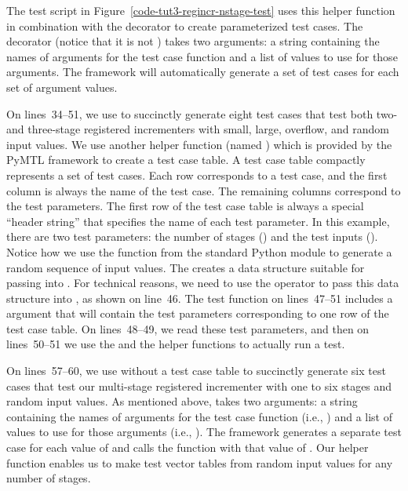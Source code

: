 \documentclass{cbxdoc}
\begin{document}
The test script in Figure~\ref{code-tut3-regincr-nstage-test} uses this
helper function in combination with the 
decorator to create parameterized test cases. The
 decorator (notice that it is
 not ) takes two arguments: a string
containing the names of arguments for the test case function and a list
of values to use for those arguments. The  framework will
automatically generate a set of test cases for each set of argument
values.

On lines~34--51, we use  to succinctly
generate eight test cases that test both two- and three-stage registered
incrementers with small, large, overflow, and random input values. We use
another helper function (named ) which is
provided by the PyMTL framework to create a test case table. A test case
table compactly represents a set of test cases. Each row corresponds to a
test case, and the first column is always the name of the test case. The
remaining columns correspond to the test parameters. The first row of the
test case table is always a special ``header string'' that specifies the
name of each test parameter. In this example, there are two test
parameters: the number of stages () and the test inputs
(). Notice how we use the  function from the
standard Python  module to generate a random sequence of input
values. The  creates a data structure suitable
for passing into . For technical reasons, we
need to use the \TT{**} operator to pass this data structure into
, as shown on line~46. The test function on
lines~47--51 includes a  argument that will contain the
test parameters corresponding to one row of the test case table. On
lines~48--49, we read these test parameters, and then on lines~50--51 we
use the  and the 
helper functions to actually run a test.

On lines~57--60, we use  without a test case
table to succinctly generate six test cases that test our multi-stage
registered incrementer with one to six stages and random input values. As
mentioned above,  takes two arguments: a
string containing the names of arguments for the test case function
(i.e., ) and a list of values to use for those arguments (i.e.,
\TT{[1,2,3,4,5,6]}). The  framework generates a separate test
case for each value of  and calls the  function
with that value of . Our  helper
function enables us to make test vector tables from random input values
for any number of stages.
\end{document}
